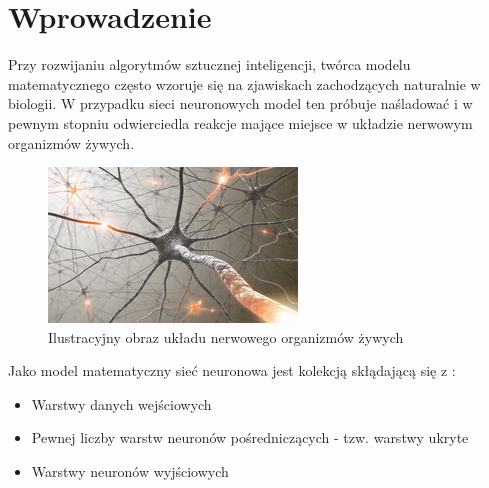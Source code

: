 \documentclass{classrep}
\begin{document}
\section{Wprowadzenie}
{
Przy rozwijaniu algorytmów sztucznej inteligencji, twórca modelu matematycznego często wzoruje się na zjawiskach zachodzących naturalnie w biologii.
W przypadku sieci neuronowych \ppauza model ten próbuje naśladować \ppauza i w pewnym stopniu odwierciedla reakcje mające miejsce w układzie nerwowym organizmów żywych. 
    \begin{figure}[!htbp]
            \centering
            \includegraphics[width=\textwidth, width=90mm]{neural_biolo.jpg}
            \caption{Ilustracyjny obraz układu nerwowego organizmów żywych}
            \label{neural_biolo}
    \end{figure}
 Jako model matematyczny sieć neuronowa jest kolekcją skłądającą się z :
    \begin{itemize}
            \item Warstwy danych wejściowych
	\item Pewnej liczby warstw neuronów pośredniczących - tzw. warstwy ukryte
	\item Warstwy neuronów wyjściowych
           

\end{itemize}}
\end{document}
